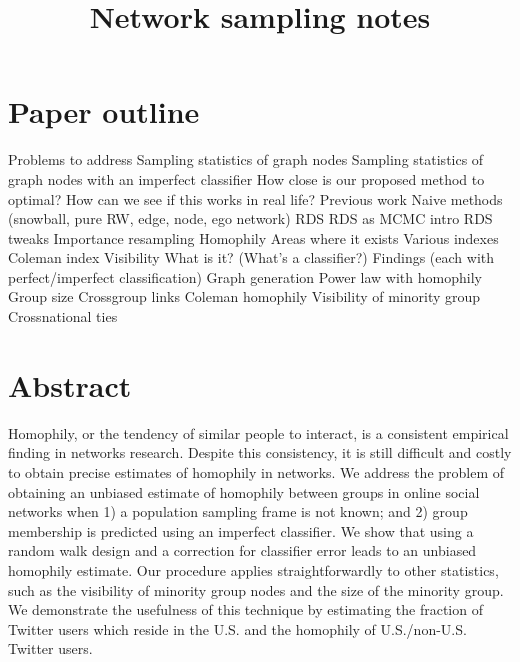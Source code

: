 \documentclass[a4paper]{article}
\title{Network sampling notes}
\author{}
\begin{document}
\maketitle



\section{Paper outline}

\begin{outline}[enumerate]
\1 Problems to address
	\2 Sampling statistics of graph nodes
    \2 Sampling statistics of graph nodes with an imperfect classifier
    \2 How close is our proposed method to optimal?
    \2 How can we see if this works in real life?
\1 Previous work
	\2 Naive methods (snowball, pure RW, edge, node, ego network)
    \2 RDS
    	\3 RDS as MCMC intro
        \3 RDS tweaks
    	\3 Importance resampling
	\2 Homophily
    	\3 Areas where it exists
        \3 Various indexes
        \3 Coleman index
    \2 Visibility
    	\3 What is it?
    \2 (What's a classifier?)
\1 Findings (each with perfect/imperfect classification)
    \2 Graph generation
    	\3 Power law with homophily
	\2 Group size
    \2 Crossgroup links
    \2 Coleman homophily
    \2 Visibility of minority group
    \2 Crossnational ties
\end{outline}

\section{Abstract}

Homophily, or the tendency of similar people to interact, is a consistent empirical finding in networks research. Despite this consistency, it is still difficult and costly to obtain precise estimates of homophily in networks. We address the problem of obtaining an unbiased estimate of homophily between groups in online social networks when 1) a population sampling frame is not known; and 2) group membership is predicted using an imperfect classifier. We show that using a random walk design and a correction for classifier error leads to an unbiased homophily estimate. Our procedure applies straightforwardly to other statistics, such as the visibility of minority group nodes and the size of the minority group. We demonstrate the usefulness of this technique by estimating the fraction of Twitter users which reside in the U.S. and the homophily of U.S./non-U.S. Twitter users.
\end{document}
